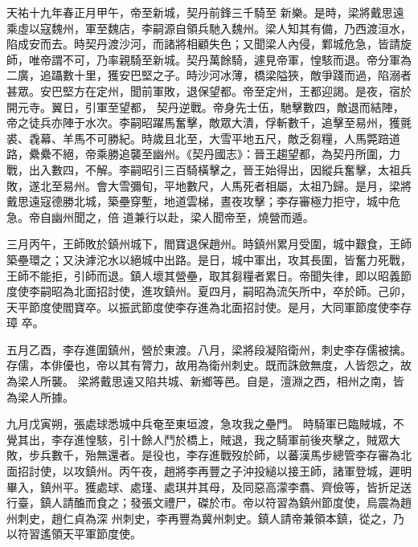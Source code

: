 \begin{pinyinscope}
 天祐十九年春正月甲午，帝至新城，契丹前鋒三千騎至
 新樂。是時，梁將戴思遠乘虛以寇魏州，軍至魏店，李嗣源自領兵馳入魏州。梁人知其有備，乃西渡洹水，陷成安而去。時契丹渡沙河，而諸將相顧失色；又聞梁人內侵，鄴城危急，皆請旋師，唯帝謂不可，乃率親騎至新城。契丹萬餘騎，遽見帝軍，惶駭而退。帝分軍為二廣，追躡數十里，獲安巴堅之子。時沙河冰薄，橋梁隘狹，敵爭踐而過，陷溺者甚眾。安巴堅方在定州，聞前軍敗，退保望都。帝至定州，王都迎謁。是夜，宿於開元寺。翼日，引軍至望都，
 契丹逆戰。帝身先士伍，馳擊數四，敵退而結陣，帝之徒兵亦陣于水次。李嗣昭躍馬奮擊，敵眾大潰，俘斬數千，追擊至易州，獲氈裘、毳幕、羊馬不可勝紀。時歲且北至，大雪平地五尺，敵乏芻糧，人馬斃踣道路，纍纍不絕，帝乘勝追襲至幽州。《契丹國志》：晉王趨望都，為契丹所圍，力戰，出入數四，不解。李嗣昭引三百騎橫擊之，晉王始得出，因縱兵奮擊，太祖兵敗，遂北至易州。會大雪彌旬，平地數尺，人馬死者相屬，太祖乃歸。是月，梁將戴思遠寇德勝北城，築壘穿塹，地道雲梯，晝夜攻擊；李存審極力拒守，城中危急。帝自幽州聞之，倍
 道兼行以赴，梁人聞帝至，燒營而遁。



 三月丙午，王師敗於鎮州城下，閻寶退保趙州。時鎮州累月受圍，城中艱食，王師築壘環之；又決滹沱水以絕城中出路。是日，城中軍出，攻其長圍，皆奮力死戰，王師不能拒，引師而退。鎮人壞其營壘，取其芻糧者累日。帝聞失律，即以昭義節度使李嗣昭為北面招討使，進攻鎮州。夏四月，嗣昭為流矢所中，卒於師。己卯，天平節度使閻寶卒。以振武節度使李存進為北面招討使。是月，大同軍節度使李存璋
 卒。


五月乙酉，李存進圍鎮州，營於東渡。八月，梁將段凝陷衛州，刺史李存儒被擒。存儒，本俳優也，帝以其有膂力，故用為衛州刺史。既而誅斂無度，人皆怨之，故為梁人所襲。
 梁將戴思遠又陷共城、新鄉等邑。自是，澶淵之西，相州之南，皆為梁人所據。



 九月戊寅朔，張處球悉城中兵奄至東垣渡，急攻我之壘門。
 時騎軍已臨賊城，不覺其出，李存進惶駭，引十餘人鬥於橋上，賊退，我之騎軍前後夾擊之，賊眾大敗，步兵數千，殆無還者。是役也，李存進戰歿於師，以蕃漢馬步總管李存審為北面招討使，以攻鎮州。丙午夜，趙將李再豐之子沖投縋以接王師，諸軍登城，遲明畢入，鎮州平。獲處球、處瑾、處琪并其母，及同惡高濛李翥、齊儉等，皆折足送行臺，鎮人請醢而食之；發張文禮尸，磔於市。帝以符習為鎮州節度使，烏震為趙州刺史，趙仁貞為深
 州刺史，李再豐為冀州刺史。鎮人請帝兼領本鎮，從之，乃以符習遙領天平軍節度使。




\end{pinyinscope}
